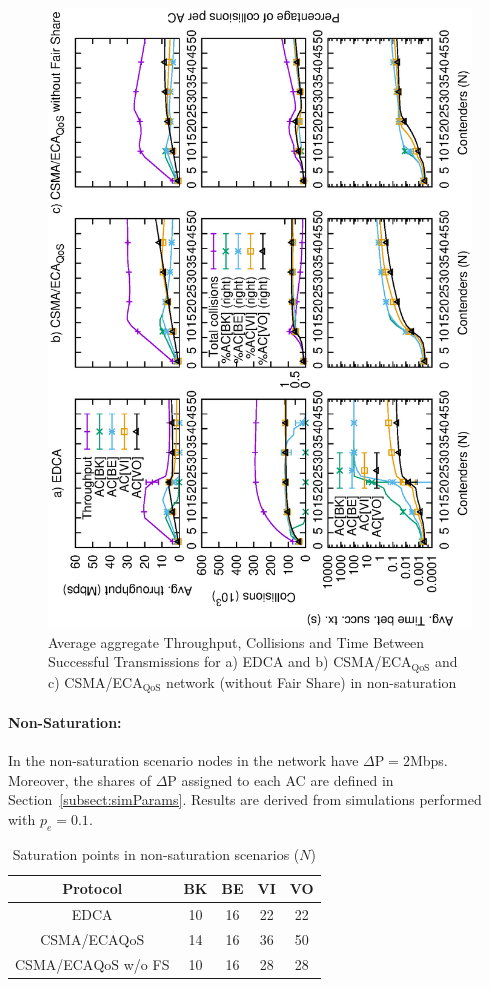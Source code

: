 \begin{figure}[t]
	\centering
		\includegraphics[width=0.7\linewidth,angle = -90]{figures/multiplot-unsat-error-0-1.eps}
		\caption{Average aggregate Throughput, Collisions and Time Between Successful Transmissions for a) EDCA and b) CSMA/ECA$_{\text{QoS}}$ and c) CSMA/ECA$_{\text{QoS}}$ network (without Fair Share) in non-saturation}
		\label{fig:multiplotUnsat}
\end{figure}

\paragraph{Non-Saturation:} In the non-saturation scenario nodes in the network have $\Delta\text{P}=2$Mbps. Moreover, the shares of $\Delta\text{P}$ assigned to each AC are defined in Section~\ref{subsect:simParams}. Results are derived from simulations performed with $p_e=0.1$.

	\begin{table}[t]
		\centering
		\caption{Saturation points in non-saturation scenarios ($N$)}
		\label{tab:satPoints}
		\begin{tabular}{|c|c|c|c|c|}
			\hline
			{\bfseries Protocol} 				& {\bfseries BK} & {\bfseries BE} & {\bfseries VI} & {\bfseries VO}\\
			\hline
			EDCA						&	10		&	16		&		22	&	22\\	
			\hline
			CSMA/ECA${\text{QoS}}$		&	14		&	16		&		36	&	50\\
			\hline
			CSMA/ECA${\text{QoS}}$ w/o FS	&	10		&	16		&		28	&	28\\
			\hline
		\end{tabular}
	\end{table}

